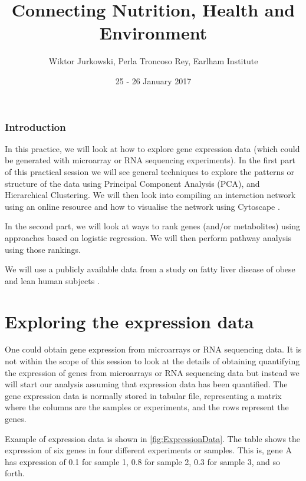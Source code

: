 \documentclass[11pt, oneside]{article}   	%
\title{Connecting Nutrition, Health and Environment }
\author{Wiktor Jurkowski, Perla Troncoso Rey, Earlham Institute}
\date{25 - 26 January 2017}	 %
\begin{document}
\maketitle

\tableofcontents

\listoffigures
\listoftables


\section{Introduction}

In this practice, we will look at how to explore gene expression data (which could be generated with microarray or RNA sequencing experiments). In the first part of this practical session we will see general techniques to explore the patterns or structure of the data using Principal Component Analysis (PCA), and Hierarchical Clustering. We will then look into compiling an interaction network using an online resource and how to visualise the network using Cytoscape \cite{Shannon2003} \cite{Smoot2011}.

In the second part, we will look at ways to rank genes (and/or metabolites) using approaches based on logistic regression. We will then perform pathway analysis using those rankings.

We will use a publicly available data from a study on fatty liver disease of obese and lean human subjects \cite{Wruck2015}.



\part{Exploring the expression data}

One could obtain gene expression from microarrays or RNA sequencing data. It is not within the scope of this session to look at the details of obtaining quantifying the expression of genes from microarrays or RNA sequencing data but instead we will start our analysis assuming that expression data has been quantified.
The gene expression data is normally stored in tabular file, representing a matrix where the columns are the samples or experiments, and the rows represent the genes. 

Example of expression data is shown in \autoref{fig:ExpressionData}. The table shows the expression of six genes in four different experiments or samples. This is, gene A has expression of 0.1 for sample 1, 0.8 for sample 2, 0.3 for sample 3, and so forth. 
\end{document}
